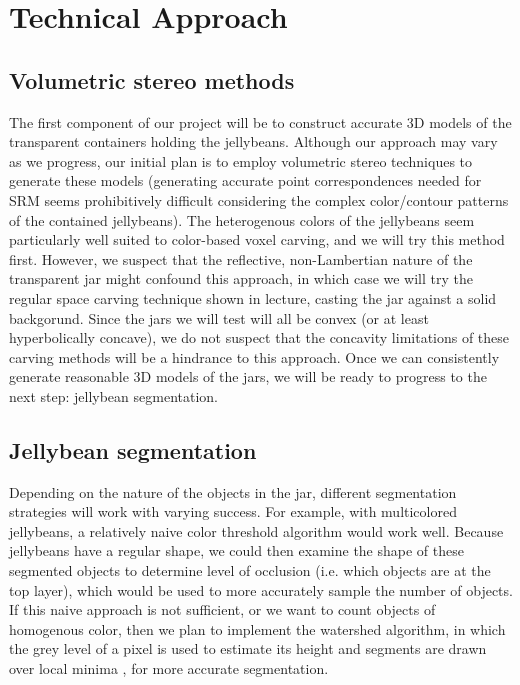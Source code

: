 \documentclass{article}
\begin{document}
\section*{Technical Approach}

\subsection*{Volumetric stereo methods}

The first component of our project will be to construct accurate 3D models of the transparent containers holding the jellybeans. Although our approach may vary as we progress, our initial plan is to employ volumetric stereo techniques to generate these models (generating accurate point correspondences needed for SRM seems prohibitively difficult considering the complex color/contour patterns of the contained jellybeans). The heterogenous colors of the jellybeans seem particularly well suited to color-based voxel carving, and we will try this method first. However, we suspect that the reflective, non-Lambertian nature of the transparent jar might confound this approach, in which case we will try the regular space carving technique shown in lecture, casting the jar against a solid backgorund. Since the jars we will test will all be convex (or at least hyperbolically concave), we do not suspect that the concavity limitations of these carving methods will be a hindrance to this approach. Once we can consistently generate reasonable 3D models of the jars, we will be ready to progress to the next step: jellybean segmentation.

\subsection*{Jellybean segmentation}

Depending on the nature of the objects in the jar, different segmentation strategies will work with varying success. For example, with multicolored jellybeans, a relatively naive color threshold algorithm would work well. Because jellybeans have a regular shape, we could then examine the shape of these segmented objects to determine level of occlusion (i.e. which objects are at the top layer), which would be used to more accurately sample the number of objects. If this naive approach is not sufficient, or we want to count objects of homogenous color, then we plan to implement the watershed algorithm, in which the grey level of a pixel is used to estimate its height and segments are drawn over local minima \cite{Watershed}, for more accurate segmentation.
\end{document}
